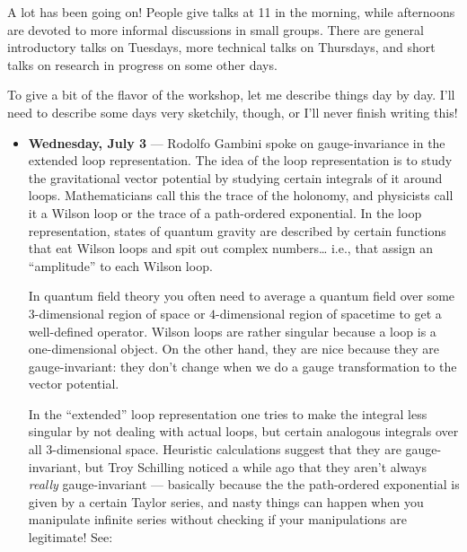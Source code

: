 \documentclass{article}
\def\tightlist{}
\renewcommand{\texttt}[1]{%
  \begingroup
  \ttfamily
  \begingroup\lccode`~=`/\lowercase{\endgroup\def~}{/\discretionary{}{}{}}%
  \begingroup\lccode`~=`[\lowercase{\endgroup\def~}{[\discretionary{}{}{}}%
  \begingroup\lccode`~=`.\lowercase{\endgroup\def~}{.\discretionary{}{}{}}%
  \catcode`/=\active\catcode`[=\active\catcode`.=\active
  \scantokens{#1\noexpand}%
  \endgroup
}
\begin{document}
A lot has been going on! People give talks at 11 in the morning, while
afternoons are devoted to more informal discussions in small groups.
There are general introductory talks on Tuesdays, more technical talks
on Thursdays, and short talks on research in progress on some other
days.

To give a bit of the flavor of the workshop, let me describe things day
by day. I'll need to describe some days very sketchily, though, or I'll
never finish writing this!

\begin{itemize}
\item
  \textbf{Wednesday, July 3} --- Rodolfo Gambini spoke on
  gauge-invariance in the extended loop representation. The idea of the
  loop representation is to study the gravitational vector potential by
  studying certain integrals of it around loops. Mathematicians call
  this the trace of the holonomy, and physicists call it a Wilson loop
  or the trace of a path-ordered exponential. In the loop
  representation, states of quantum gravity are described by certain
  functions that eat Wilson loops and spit out complex numbers\ldots{}
  i.e., that assign an ``amplitude'' to each Wilson loop.

  In quantum field theory you often need to average a quantum field over
  some \(3\)-dimensional region of space or \(4\)-dimensional region of
  spacetime to get a well-defined operator. Wilson loops are rather
  singular because a loop is a one-dimensional object. On the other
  hand, they are nice because they are gauge-invariant: they don't
  change when we do a gauge transformation to the vector potential.

  In the ``extended'' loop representation one tries to make the integral
  less singular by not dealing with actual loops, but certain analogous
  integrals over all \(3\)-dimensional space. Heuristic calculations
  suggest that they are gauge-invariant, but Troy Schilling noticed a
  while ago that they aren't always \emph{really} gauge-invariant ---
  basically because the the path-ordered exponential is given by a
  certain Taylor series, and nasty things can happen when you manipulate
  infinite series without checking if your manipulations are legitimate!
  See:



\end{itemize}
\end{document}
